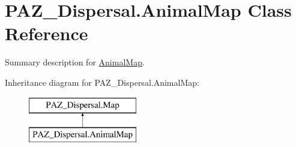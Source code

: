 \hypertarget{class_p_a_z___dispersal_1_1_animal_map}{\section{P\-A\-Z\-\_\-\-Dispersal.\-Animal\-Map Class Reference}
\label{class_p_a_z___dispersal_1_1_animal_map}
}


Summary description for \hyperlink{class_p_a_z___dispersal_1_1_animal_map}{Animal\-Map}.  


Inheritance diagram for P\-A\-Z\-\_\-\-Dispersal.\-Animal\-Map\-:\begin{figure}[H]
\begin{center}
\leavevmode
\includegraphics[height=2.000000cm]{class_p_a_z___dispersal_1_1_animal_map}
\end{center}
\end{figure}
